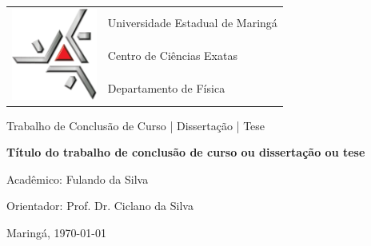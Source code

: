 \begin{titlepage}
	\begin{center}
		\begin{tabular}{m{4cm}m{10cm}}
			\multirow{3}{*}{\vspace{-0.5cm}\includegraphics[width=2.8cm]{fig/uem}}
			& {\LARGE Universidade Estadual de Maringá} \\
			& {\LARGE Centro de Ciências Exatas} \\
			& {\LARGE Departamento de Física} \\
		\end{tabular}
		\vspace{1.8cm}
	
		{\LARGE Trabalho de Conclusão de Curso | Dissertação | Tese}
		\vspace{4.0cm}

		{\LARGE {\bf Título do trabalho de conclusão de curso
ou dissertação ou tese}}
		\vfill

		{\Large Acadêmico: Fulando da Silva}
		\vspace{0.8cm}
	
		{\Large Orientador: Prof. Dr. Ciclano da Silva}
		\vspace{1.2cm}
		
		{\large Maringá, \today}
	\end{center}
\end{titlepage}

